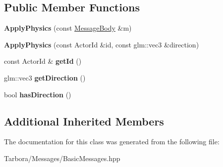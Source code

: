 \subsection*{Public Member Functions}
\begin{DoxyCompactItemize}
\item 
\mbox{\label{classTarbora_1_1Message_1_1ApplyPhysics_aaf094749948c404ccbcb22280f25c982}} 
{\bfseries Apply\+Physics} (const \hyperlink{classTarbora_1_1MessageBody}{Message\+Body} \&m)
\item 
\mbox{\label{classTarbora_1_1Message_1_1ApplyPhysics_a39dfe4cee807aaec0ff7bcac04536adf}} 
{\bfseries Apply\+Physics} (const Actor\+Id \&id, const glm\+::vec3 \&direction)
\item 
\mbox{\label{classTarbora_1_1Message_1_1ApplyPhysics_a716a5a031efecf77d7f47db3edf2955d}} 
const Actor\+Id \& {\bfseries get\+Id} ()
\item 
\mbox{\label{classTarbora_1_1Message_1_1ApplyPhysics_a80492a21ec96154ef77229d040de6d0d}} 
glm\+::vec3 {\bfseries get\+Direction} ()
\item 
\mbox{\label{classTarbora_1_1Message_1_1ApplyPhysics_a2f7b0de1155f888ae3ad29e28187280e}} 
bool {\bfseries has\+Direction} ()
\end{DoxyCompactItemize}
\subsection*{Additional Inherited Members}


The documentation for this class was generated from the following file\+:\begin{DoxyCompactItemize}
\item 
Tarbora/\+Messages/Basic\+Messages.\+hpp\end{DoxyCompactItemize}
